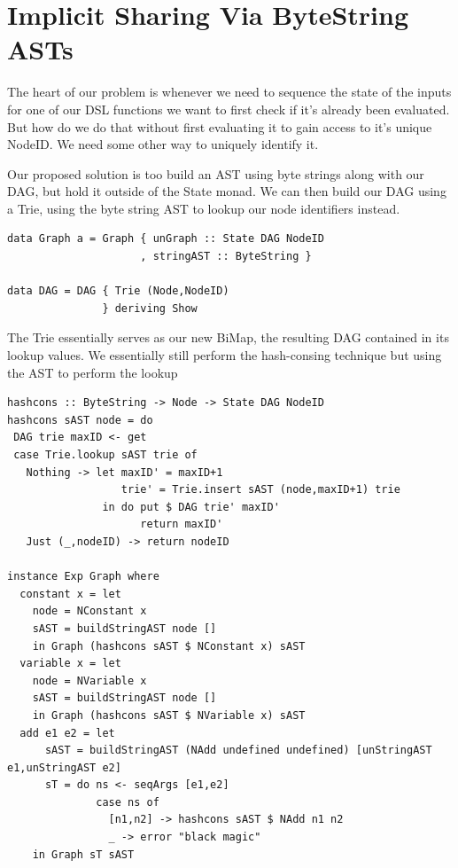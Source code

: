 \documentclass[runningheads]{llncs}
\begin{document}
\section{Implicit Sharing Via ByteString ASTs}

The heart of our problem is whenever we need to sequence the state of the inputs
for one of our DSL functions we want to first check if it's already been
evaluated. But how do we do that without first evaluating it to gain access to
it's unique NodeID. We need some other way to uniquely identify it.

Our proposed solution is too build an AST using byte strings along with our
DAG, but hold it outside of the State monad. We can then build our DAG using a
Trie, using the byte string AST to lookup our node identifiers instead.

\begin{verbatim}
data Graph a = Graph { unGraph :: State DAG NodeID
                     , stringAST :: ByteString }

data DAG = DAG { Trie (Node,NodeID)
               } deriving Show
\end{verbatim}

The Trie essentially serves as our new BiMap, the resulting DAG contained in its
lookup values. We essentially still perform the hash-consing technique but using
the AST to perform the lookup
\begin{verbatim}
hashcons :: ByteString -> Node -> State DAG NodeID
hashcons sAST node = do
 DAG trie maxID <- get
 case Trie.lookup sAST trie of
   Nothing -> let maxID' = maxID+1
                  trie' = Trie.insert sAST (node,maxID+1) trie
               in do put $ DAG trie' maxID'
                     return maxID'
   Just (_,nodeID) -> return nodeID

instance Exp Graph where
  constant x = let
    node = NConstant x
    sAST = buildStringAST node []
    in Graph (hashcons sAST $ NConstant x) sAST
  variable x = let
    node = NVariable x
    sAST = buildStringAST node []
    in Graph (hashcons sAST $ NVariable x) sAST
  add e1 e2 = let
      sAST = buildStringAST (NAdd undefined undefined) [unStringAST e1,unStringAST e2]
      sT = do ns <- seqArgs [e1,e2]
              case ns of
                [n1,n2] -> hashcons sAST $ NAdd n1 n2
                _ -> error "black magic"
    in Graph sT sAST

\end{verbatim}
\end{document}
